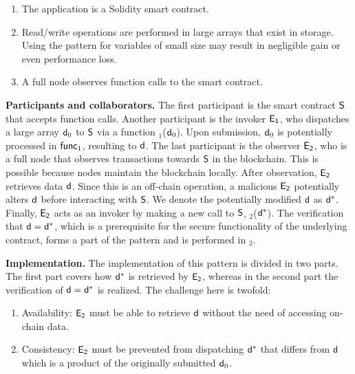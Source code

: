 \begin{enumerate}
    \item The application is a Solidity smart contract.
    \item Read/write operations are performed in large arrays that exist in
        storage. Using the pattern for variables of small size may result in
        negligible gain or even performance loss.
    \item A full node observes function calls to the smart contract.
\end{enumerate}

\noindent \textbf{Participants and collaborators.} The first participant is the
smart contract $\mathsf{S}$ that accepts function calls. Another participant is
the invoker $\mathsf{E_{1}}$, who dispatches a large array $\mathsf{d}_0$ to $\mathsf{S}$
via a function \texttt{\proc$_1$}($\mathsf{d}_0$). Upon submission, $\mathsf{d}_0$ is
potentially processed in $\textsf{func}_1$, resulting to $\mathsf{d}$. The last participant
is the observer $\mathsf{E_{2}}$, who is a full node that observes transactions
towards $\mathsf{S}$ in the blockchain. This is possible because nodes maintain
the blockchain locally. After observation, $\mathsf{E_{2}}$ retrieves data $\mathsf{d}$.
Since this is an off-chain operation, a malicious $\mathsf{E_{2}}$ potentially
alters $\mathsf{d}$ before interacting with $\mathsf{S}$. We denote the
potentially modified $\mathsf{d}$ as $\mathsf{d^*}$. Finally, $\mathsf{E_{2}}$ acts as an
invoker by making a new call to $\mathsf{S}$, \texttt{\proc$_2$}($\mathsf{d^*}$). The
verification that $\mathsf{d} = \mathsf{d^*}$, which is a prerequisite for the secure
functionality of the underlying contract, forms a part of the pattern and is
performed in \texttt{\proc$_2$}.

\noindent \textbf{Implementation.} The implementation of this pattern is
divided in two parts. The first part covers how $\mathsf{d^*}$ is retrieved by
$\mathsf{E_{2}}$, whereas in the second part the verification of $\mathsf{d}=\mathsf{d^*}$ is
realized. The challenge here is twofold:

\begin{enumerate}

    \item Availability: $\mathsf{E_{2}}$ must be able to retrieve $\mathsf{d}$ without
        the need of accessing on-chain data.

    \item Consistency: $\mathsf{E_{2}}$ must be prevented from dispatching $\mathsf{d^*}$
        that differs from $\mathsf{d}$ which is a product of the originally submitted
        $\mathsf{d}_0$.

\end{enumerate}

